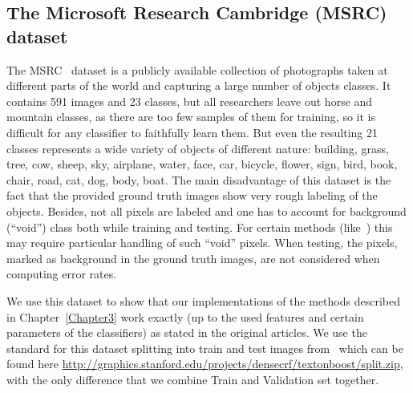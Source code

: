 \subsection{The Microsoft Research Cambridge (MSRC) dataset}
The MSRC~\cite{MSRC} dataset is a publicly available collection of photographs taken at different parts of the world and
capturing a large number of objects classes. It contains 591 images and 23 classes, but all researchers leave out horse
and mountain classes, as there are
too few samples of them for training, so it is difficult for any classifier to faithfully learn them. But even the resulting 21
classes represents a wide variety of objects of different nature: building, grass, tree, cow, sheep, sky, airplane, water,
face, car, bicycle, flower, sign, bird, book, chair, road, cat, dog, body, boat. The main disadvantage of this dataset
is the fact that the provided ground truth images show very rough labeling of the objects. Besides, not all pixels are labeled
and one has to account for background (``void'') class both while training and testing. For certain methods 
(like~\cite{Kontschieder2011}) this may require particular handling of such ``void'' pixels. When testing, the pixels, marked
as background in the ground truth images, are not considered when computing error rates.

We use this dataset to show that our implementations of the methods described in Chapter~\ref{Chapter3} work exactly (up to the used features and certain
parameters of the classifiers) as stated in the original articles. We use the standard for this dataset splitting into train and
test images from~\cite{Krahenbuhl2011} which can be found here
\url{http://graphics.stanford.edu/projects/densecrf/textonboost/split.zip}, with the only difference that we combine Train and
Validation set together.

